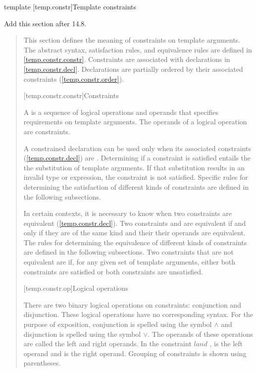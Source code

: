 template
[temp.constr]{Template constraints}

Add this section after 14.8.

\begin{quote}

\pnum
\enternote
This section defines the meaning of constraints on template arguments.
% 
The abstract syntax, satisfaction rules, and equivalence rules are defined
in \ref{temp.constr.constr}. 
% 
Constraints are associated with declarations in \ref{temp.constr.decl}.
% 
Declarations are partially ordered by their associated constraints 
(\ref{temp.constr.order}).
\exitnote


[temp.constr.constr]{Constraints}

\pnum
A  is a sequence of logical operations and 
operands that specifies requirements on template arguments.
\enternote The operands of a logical operation are constraints. \exitnote


\pnum
A constrained declaration can be used only when its associated
constraints (\ref{temp.constr.decl}) are . 
% 
Determining if a constraint is satisfied entails the the substitution 
of template arguments. If that substitution results in an invalid type or 
expression, the constraint is not satisfied.
% 
Specific rules for determining the satisfaction of different kinds of 
constraints are defined in the following subsections.


\pnum 
In certain contexts, it is necessary to know when two constraints are equivalent
(\ref{temp.constr.decl}). Two constraints  and  are
equivalent if and only if they are of the same kind and their their operands are
equivalent. The rules for determining the equivalence of different kinds of
constraints are defined in the following subsections.
% 
Two constraints that are not equivalent are  if,
for any given set of template arguments, either both constraints are satisfied
or both constraints are unsatisfied.


[temp.constr.op]{Logical operations}

\pnum
There are two binary logical operations on constraints: conjunction
and disjunction.
% 
\enternote 
These logical operations have no corresponding \Cpp syntax.
For the purpose of exposition, conjunction is spelled
using the symbol $\land$ and disjunction is spelled using the 
symbol $\lor$. 
% 
The operands of these operations are called the left 
and right operands. In the constraint  $land$ ,
 is the left operand and  is the right operand.
% 
Grouping of constraints is shown using parentheses.
\exitnote


\end{quote}
